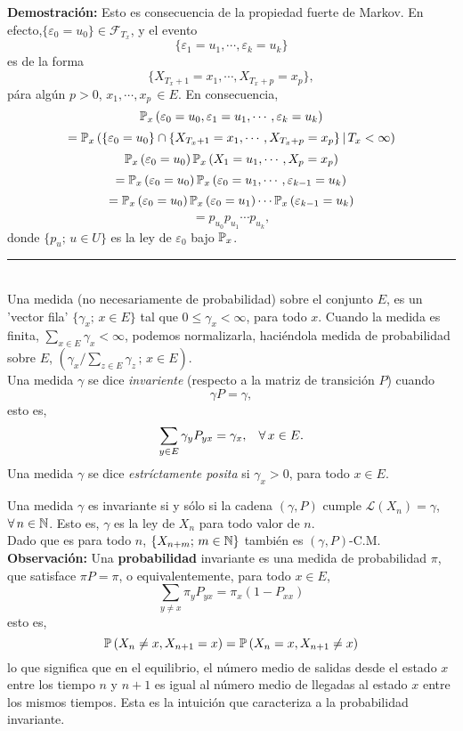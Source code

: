 \textbf{Demostración: }Esto es consecuencia de la propiedad fuerte de Markov. En efecto,\newline $\{\varepsilon_0 = u_0\}\in \mathcal{F}_{T_x}$, y el evento
\[\{\varepsilon_1 = u_1,\cdots,\varepsilon_k = u_k\}\]
es de la forma
\[\{X_{T_x+1}=x_1,\cdots,X_{T_x+p}=x_p\},\]
pára algún $p>0$, $x_1,\cdots,x_p\,\in E$. En consecuencia,
\[\mathbb{P}_x\left(\varepsilon_0 = u_0,\varepsilon_1 = u_1,\cdots, \varepsilon_k = u_k\right)\]
\[= \mathbb{P}_x\left(\{\varepsilon_0 = u_0\}\cap\{X_{T_x+1}=x_1,\cdots,X_{T_x +p}=x_p\}\,|\,T_x <\infty\right)\]
\[\mathbb{P}_x\left(\varepsilon_0 =u_0\right)\mathbb{P}_x\left(X_1=u_1,\cdots,X_p =x_p\right)\]
\[=\mathbb{P}_x\left(\varepsilon_0=u_0\right)\mathbb{P}_x\left(\varepsilon_0=u_1,\cdots,\varepsilon_{k-1}=u_k\right)\]
\[=\mathbb{P}_x\left(\varepsilon_0 =u_0\right)\mathbb{P}_x\left(\varepsilon_0=u_1\right)\cdots\mathbb{P}_x\left(\varepsilon_{k-1}=u_k\right)\]
\[=p_{u_0}p_{u_1}\cdots p_{u_k},\]
donde $\{p_u;\,u\in U\}$ es la ley de $\varepsilon_0$ bajo $\mathbb{P}_x$.\\
\rule{0.7em}{0.7em}\\ \newline
Una medida (no necesariamente de probabilidad) sobre el conjunto $E$, es un 'vector fila' $\{\gamma_x;\,x\in E\}$ tal que $0\leq \gamma_x < \infty$, para todo $x$. Cuando la medida es finita, $\sum_{x\in E}\gamma_x <\infty$, podemos normalizarla, haciéndola medida de probabilidad sobre $E$, $\left(\gamma_x / \sum_{z\in E}\gamma_z\, ;\,x\in E\right)$.\\ Una medida $\gamma$ se dice \textit{invariente} (respecto a la matriz de transición $P$) cuando
\[\gamma P = \gamma,\]
esto es, 
\[\sum_{y\in E}\gamma_y P_{yx} = \gamma_x,\hspace{0.3cm}\forall\,x\in E.\]
Una medida $\gamma$ se dice \textit{estríctamente posita} si $\gamma_x >0$, para todo $x\in E$.\\ \newline

Una medida $\gamma$ es invariante si y sólo si  la cadena $(\gamma,P)$ cumple $\mathcal{L}(X_n)=\gamma$, $\forall\,n\in \mathbb N$. Esto es, $\gamma$ es la ley de $X_n$ para todo valor de $n$.\\ Dado que es para todo $n$, $\{X_{n+m};\,m\in\mathbb N\}$ también es $(\gamma,P)$-C.M.\\ \newline
\textbf{Observación: }Una \textbf{probabilidad} invariante es una medida de probabilidad  $\pi$, que satisface $\pi P = \pi$, o equivalentemente, para todo $x\in E$,
\[\sum_{y\neq x}\pi_y P_{yx} = \pi_x\left(1- P_{xx}\right)\]
esto es,
\[\mathbb{P}\left(X_n\neq x ,X_{n+1}=x\right) = \mathbb{P}\left(X_n = x,X_{n+1}\neq x\right)\]
lo que significa que en el equilibrio, el número medio de salidas  desde el estado $x$ entre los tiempo $n$ y $n+1$ es igual al número medio de llegadas al estado $x$ entre los mismos tiempos. Esta es la intuición que caracteriza a la probabilidad invariante.

